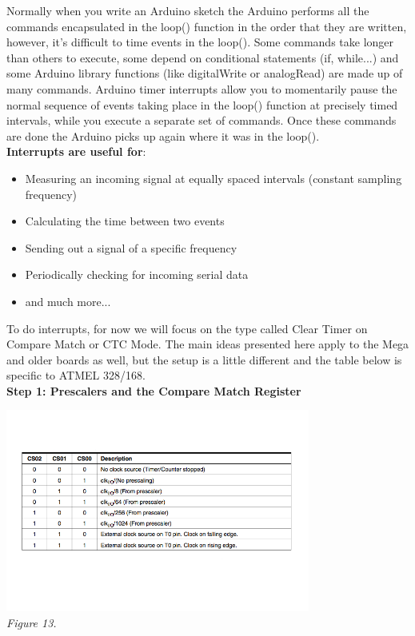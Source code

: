 \documentclass[a4paper]{article}
\begin{document}
\medskip
Normally when you write an Arduino sketch the Arduino performs all the commands encapsulated in the loop() {} function in the order that they are written, however, it's difficult to time events in the loop(). Some commands take longer than others to execute, some depend on conditional statements (if, while...) and some Arduino library functions (like digitalWrite or analogRead) are made up of many commands. Arduino timer interrupts allow you to momentarily pause the normal sequence of events taking place in the loop() function at precisely timed intervals, while you execute a separate set of commands. Once these commands are done the Arduino picks up again where it was in the loop().\bigskip\\
\textbf{Interrupts are useful for}:
\begin{itemize}
    \item Measuring an incoming signal at equally spaced intervals (constant sampling frequency)
    \item Calculating the time between two events
    \item Sending out a signal of a specific frequency
    \item Periodically checking for incoming serial data
    \item and much more...
\end{itemize}
\medskip
To do interrupts, for now we will focus on the type called Clear Timer on Compare Match or CTC Mode. The main ideas presented here apply to the Mega and older boards as well, but the setup is a little different and the table below is specific to ATMEL 328/168.\bigskip\\
\textbf{Step 1: Prescalers and the Compare Match Register}
\medskip
\begin{center}
    \includegraphics[width=10cm]{pictures/16.png}\\
    \textit{Figure 13.}\\
\end{center}
\end{document}
